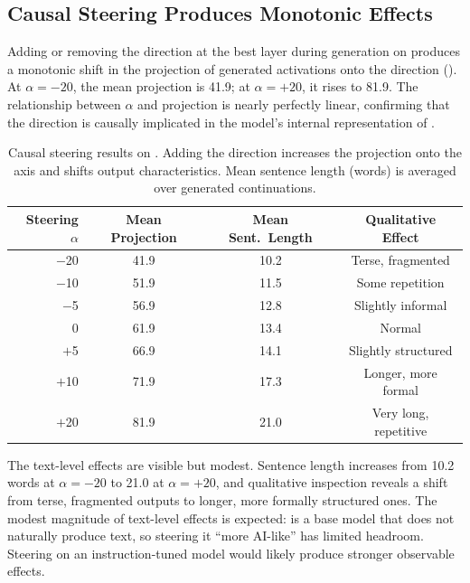 \subsection{Causal Steering Produces Monotonic Effects}
\label{sec:steering}

Adding or removing the \diffmean direction at the best layer during generation on \pythia produces a monotonic shift in the projection of generated activations onto the \aistyle direction ().
At $\alpha = -20$, the mean projection is 41.9; at $\alpha = +20$, it rises to 81.9.
The relationship between $\alpha$ and projection is nearly perfectly linear, confirming that the direction is causally implicated in the model's internal representation of \aistyle.

\begin{table}[t]
    \centering
    \caption{Causal steering results on \pythia. Adding the \diffmean direction increases the projection onto the \aistyle axis and shifts output characteristics. Mean sentence length (words) is averaged over generated continuations.}
    \begin{tabular}{@{}rccc@{}}
        \toprule
        Steering $\alpha$ & Mean Projection & Mean Sent.\ Length & Qualitative Effect \\
        \midrule
        $-$20 & 41.9 & 10.2 & Terse, fragmented \\
        $-$10 & 51.9 & 11.5 & Some repetition \\
        $-$5  & 56.9 & 12.8 & Slightly informal \\
        0     & 61.9 & 13.4 & Normal \\
        $+$5  & 66.9 & 14.1 & Slightly structured \\
        $+$10 & 71.9 & 17.3 & Longer, more formal \\
        $+$20 & 81.9 & 21.0 & Very long, repetitive \\
        \bottomrule
    \end{tabular}
    \label{tab:steering}
\end{table}

The text-level effects are visible but modest.
Sentence length increases from 10.2 words at $\alpha = -20$ to 21.0 at $\alpha = +20$, and qualitative inspection reveals a shift from terse, fragmented outputs to longer, more formally structured ones.
The modest magnitude of text-level effects is expected: \pythia is a base model that does not naturally produce \aistyle text, so steering it ``more AI-like'' has limited headroom.
Steering on an instruction-tuned model would likely produce stronger observable effects.
